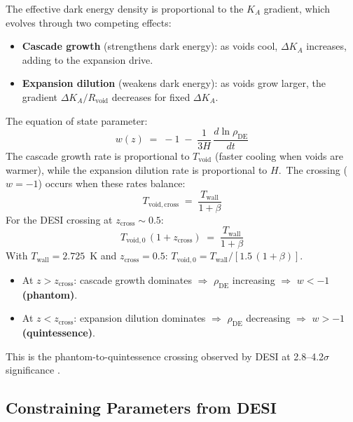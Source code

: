 \documentclass[12pt,letterpaper]{article}
\newcommand{\Ka}{K_{\!A}}
\begin{document}
The effective dark energy density is proportional to the $\Ka$ gradient,
which evolves through two competing effects:

\begin{itemize}[leftmargin=2em]
  \item \textbf{Cascade growth} (strengthens dark energy): as voids cool,
    $\Delta\Ka$ increases, adding to the expansion drive.
  \item \textbf{Expansion dilution} (weakens dark energy): as voids grow
    larger, the gradient $\Delta\Ka/R_{\mathrm{void}}$ decreases for
    fixed $\Delta\Ka$.
\end{itemize}

The equation of state parameter:
%
\begin{equation}
  w(z) \;=\; -1 \;-\; \frac{1}{3H}\,\frac{d\ln\rho_{\mathrm{DE}}}{dt}
  \label{eq:w-def}
\end{equation}
%
The cascade growth rate is proportional to $T_{\mathrm{void}}$ (faster
cooling when voids are warmer), while the expansion dilution rate is
proportional to $H$.\ The crossing ($w = -1$) occurs when these rates
balance:
%
\begin{equation}
  T_{\mathrm{void,cross}} \;=\;
    \frac{T_{\mathrm{wall}}}{1 + \beta}
  \label{eq:T-cross}
\end{equation}
%
For the DESI crossing at $z_{\mathrm{cross}} \sim 0.5$:
%
\begin{equation}
  T_{\mathrm{void},0}\,(1 + z_{\mathrm{cross}})
    \;=\; \frac{T_{\mathrm{wall}}}{1 + \beta}
  \label{eq:z-cross}
\end{equation}
%
With $T_{\mathrm{wall}} = 2.725$~K and $z_{\mathrm{cross}} = 0.5$:
$T_{\mathrm{void},0} = T_{\mathrm{wall}}/[1.5\,(1 + \beta)]$.

\begin{itemize}[leftmargin=2em]
  \item At $z > z_{\mathrm{cross}}$: cascade growth dominates
    $\Rightarrow$ $\rho_{\mathrm{DE}}$ increasing $\Rightarrow$ $w < -1$
    \textbf{(phantom)}.
  \item At $z < z_{\mathrm{cross}}$: expansion dilution dominates
    $\Rightarrow$ $\rho_{\mathrm{DE}}$ decreasing $\Rightarrow$ $w > -1$
    \textbf{(quintessence)}.
\end{itemize}

This is the phantom-to-quintessence crossing observed by DESI at
2.8--4.2$\sigma$ significance \cite{desi2025}.


\subsection{Constraining Parameters from DESI}
\end{document}
